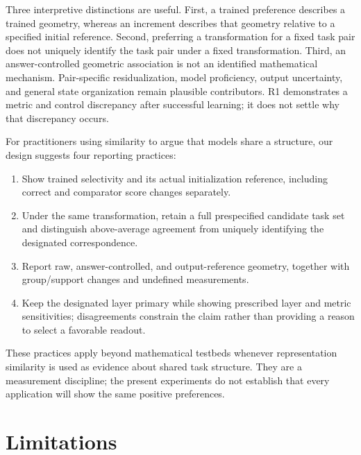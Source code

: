 \documentclass[10pt]{article}
\begin{document}
Three interpretive distinctions are useful. First, a trained preference
describes a trained geometry, whereas an increment describes that geometry
relative to a specified initial reference. Second, preferring a
transformation for a fixed task pair does not uniquely identify the task
pair under a fixed transformation. Third, an answer-controlled geometric
association is not an identified mathematical mechanism. Pair-specific
residualization, model proficiency, output uncertainty, and general state
organization remain plausible contributors. R1 demonstrates a metric and
control discrepancy after successful learning; it does not settle why that
discrepancy occurs.

For practitioners using similarity to argue that models share a structure,
our design suggests four reporting practices:
\begin{enumerate}
\item Show trained selectivity and its actual initialization reference,
including correct and comparator score changes separately.
\item Under the same transformation, retain a full prespecified candidate
task set and distinguish above-average agreement from uniquely identifying
the designated correspondence.
\item Report raw, answer-controlled, and output-reference geometry, together
with group/support changes and undefined measurements.
\item Keep the designated layer primary while showing prescribed layer and
metric sensitivities; disagreements constrain the claim rather than
providing a reason to select a favorable readout.
\end{enumerate}
These practices apply beyond mathematical testbeds whenever representation
similarity is used as evidence about shared task structure. They are a
measurement discipline; the present experiments do not establish that every
application will show the same positive preferences.

\section{Limitations}
\label{sec:limitations}
\end{document}
